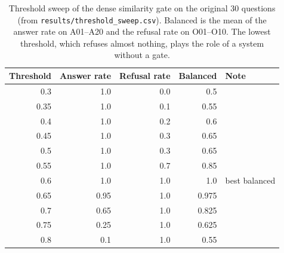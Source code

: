\begin{table}[htbp]
\centering
\caption{Threshold sweep of the dense similarity gate on the original 30 questions (from \texttt{results/threshold\_sweep.csv}). Balanced is the mean of the answer rate on A01--A20 and the refusal rate on O01--O10. The lowest threshold, which refuses almost nothing, plays the role of a system without a gate.}
\label{tab:sweep}
{%
\begin{tabular}{rrrrl}
\toprule
Threshold & Answer rate & Refusal rate & Balanced & Note \\
\midrule
0.3 & 1.0 & 0.0 & 0.5 &  \\
0.35 & 1.0 & 0.1 & 0.55 &  \\
0.4 & 1.0 & 0.2 & 0.6 &  \\
0.45 & 1.0 & 0.3 & 0.65 &  \\
0.5 & 1.0 & 0.3 & 0.65 &  \\
0.55 & 1.0 & 0.7 & 0.85 &  \\
0.6 & 1.0 & 1.0 & 1.0 & best balanced \\
0.65 & 0.95 & 1.0 & 0.975 &  \\
0.7 & 0.65 & 1.0 & 0.825 &  \\
0.75 & 0.25 & 1.0 & 0.625 &  \\
0.8 & 0.1 & 1.0 & 0.55 &  \\
\bottomrule
\end{tabular}}
\end{table}
